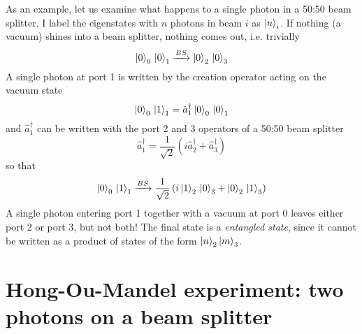 As an example, let us examine what happens to a single photon in a 50:50 beam splitter. I label the eigenstates
with $n$ photons in beam $i$ as $\ket{n}_i$. If nothing (a vacuum) shines into a beam splitter, nothing comes out, i.e. trivially
\begin{equation}
    \ket{0}_0 \,  \ket{0}_1  \xrightarrow{BS}  \ket{0}_2 \,  \ket{0}_3
\end{equation}
A single photon at port 1 is written by the creation operator acting on the vacuum state
\begin{equation}
    \ket{0}_0 \,  \ket{1}_1 = \hat{a}^\dagger_1 \ket{0}_0 \,  \ket{0}_1 
\end{equation}
and $\hat{a}^\dagger_1$ can be written with the port 2 and 3 operators of a 50:50 beam splitter
\begin{equation}
    \hat{a}^\dagger_1 = \frac{1}{\sqrt{2}} \left( i \hat{a}^\dagger_2 + \hat{a}^\dagger_3 \right)
\end{equation}
so that 
\begin{equation}
    \ket{0}_0 \,  \ket{1}_1  \xrightarrow{BS} \frac{1}{\sqrt{2}} \left( i   \ket{1}_2 \,  \ket{0}_3 +   \ket{0}_2 \,  \ket{1}_3 \right)
\end{equation}
A single photon entering port 1 together with a vacuum at port 0 leaves either port 2 or port 3, but not both! The final state is a \emph{entangled state}, since it cannot be written as a product of states of the form $\ket{n}_2 \ket{m}_3$.




\section{Hong-Ou-Mandel experiment: two photons on a beam splitter}

